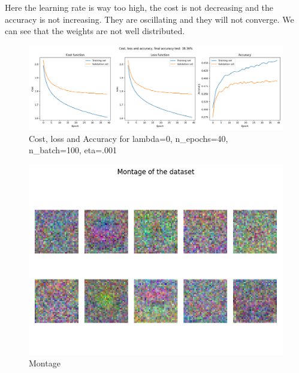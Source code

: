 \documentclass{article}
\begin{document}
Here the learning rate is way too high, the cost is not decreasing and the accuracy is not increasing. They are oscillating and they will not converge. We can see that the weights are not well distributed.
\begin{figure}[H]
    \centering
    \includegraphics[width=\linewidth]{Result_Pics/cost_loss_accuracy_0.0_40_100_0.001.png}
    \caption{Cost, loss and Accuracy for lambda=0, n\_epochs=40, n\_batch=100, eta=.001}
\end{figure}
\begin{figure}[H]
    \centering
    \includegraphics[scale=0.6]{Result_Pics/weights_0.0_40_100_0.001.png}
    \caption{Montage}
\end{figure}
\end{document}
